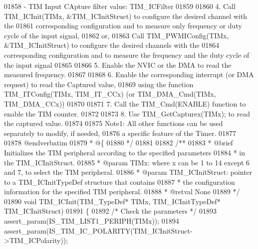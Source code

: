 \begin{DoxyCode}
01858 \textcolor{comment}{          - TIM Input CApture filter value: TIM\_ICFilter}
01859 \textcolor{comment}{       }
01860 \textcolor{comment}{       4. Call TIM\_ICInit(TIMx, &TIM\_ICInitStruct) to configure the desired channel with the }
01861 \textcolor{comment}{          corresponding configuration and to measure only frequency or duty cycle of the input signal,}
01862 \textcolor{comment}{          or,}
01863 \textcolor{comment}{          Call TIM\_PWMIConfig(TIMx, &TIM\_ICInitStruct) to configure the desired channels with the }
01864 \textcolor{comment}{          corresponding configuration and to measure the frequency and the duty cycle of the input
       signal}
01865 \textcolor{comment}{          }
01866 \textcolor{comment}{       5. Enable the NVIC or the DMA to read the measured frequency. }
01867 \textcolor{comment}{          }
01868 \textcolor{comment}{       6. Enable the corresponding interrupt (or DMA request) to read the Captured value,}
01869 \textcolor{comment}{          using the function TIM\_ITConfig(TIMx, TIM\_IT\_CCx) (or TIM\_DMA\_Cmd(TIMx, TIM\_DMA\_CCx)) }
01870 \textcolor{comment}{       }
01871 \textcolor{comment}{       7. Call the TIM\_Cmd(ENABLE) function to enable the TIM counter.}
01872 \textcolor{comment}{       }
01873 \textcolor{comment}{       8. Use TIM\_GetCapturex(TIMx); to read the captured value.}
01874 \textcolor{comment}{       }
01875 \textcolor{comment}{       Note1: All other functions can be used separately to modify, if needed,}
01876 \textcolor{comment}{              a specific feature of the Timer. }
01877 \textcolor{comment}{}
01878 \textcolor{comment}{@endverbatim}
01879 \textcolor{comment}{  * @\{}
01880 \textcolor{comment}{  */}
01881 
01882 \textcolor{comment}{/**}
01883 \textcolor{comment}{  * @brief  Initializes the TIM peripheral according to the specified parameters}
01884 \textcolor{comment}{  *         in the TIM\_ICInitStruct.}
01885 \textcolor{comment}{  * @param  TIMx: where x can be 1 to 14 except 6 and 7, to select the TIM peripheral.}
01886 \textcolor{comment}{  * @param  TIM\_ICInitStruct: pointer to a TIM\_ICInitTypeDef structure that contains}
01887 \textcolor{comment}{  *         the configuration information for the specified TIM peripheral.}
01888 \textcolor{comment}{  * @retval None}
01889 \textcolor{comment}{  */}
01890 \textcolor{keywordtype}{void} TIM_ICInit(TIM\_TypeDef* TIMx, TIM\_ICInitTypeDef* TIM\_ICInitStruct)
01891 \{
01892   \textcolor{comment}{/* Check the parameters */}
01893   assert_param(IS\_TIM\_LIST1\_PERIPH(TIMx));
01894   assert_param(IS\_TIM\_IC\_POLARITY(TIM\_ICInitStruct->TIM\_ICPolarity));

\end{DoxyCode}
